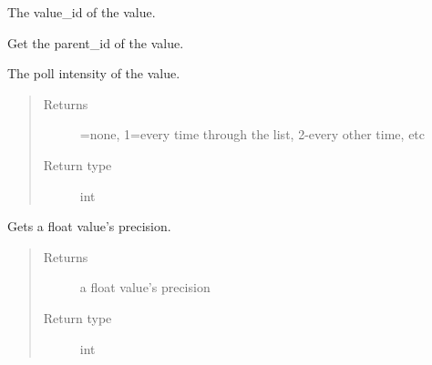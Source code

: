 \documentclass[letterpaper,10pt,english]{sphinxmanual}
\begin{document}
\begin{fulllineitems}

\begin{fulllineitems}
\label{value:openzwave.value.ZWaveValue.node}
The value\_id of the value.

\end{fulllineitems}


\begin{fulllineitems}
\label{value:openzwave.value.ZWaveValue.parent_id}
Get the parent\_id of the value.

\end{fulllineitems}


\begin{fulllineitems}
\label{value:openzwave.value.ZWaveValue.poll_intensity}
The poll intensity of the value.
\begin{quote}\begin{description}
\item[{Returns}] =none, 1=every time through the list, 2-every other time, etc

\item[{Return type}] \leavevmode
int

\end{description}\end{quote}

\end{fulllineitems}


\begin{fulllineitems}
\label{value:openzwave.value.ZWaveValue.precision}
Gets a float value's precision.
\begin{quote}\begin{description}
\item[{Returns}] \leavevmode
a float value's precision

\item[{Return type}] \leavevmode
int

\end{description}\end{quote}


\end{fulllineitems}
\end{fulllineitems}
\end{document}
